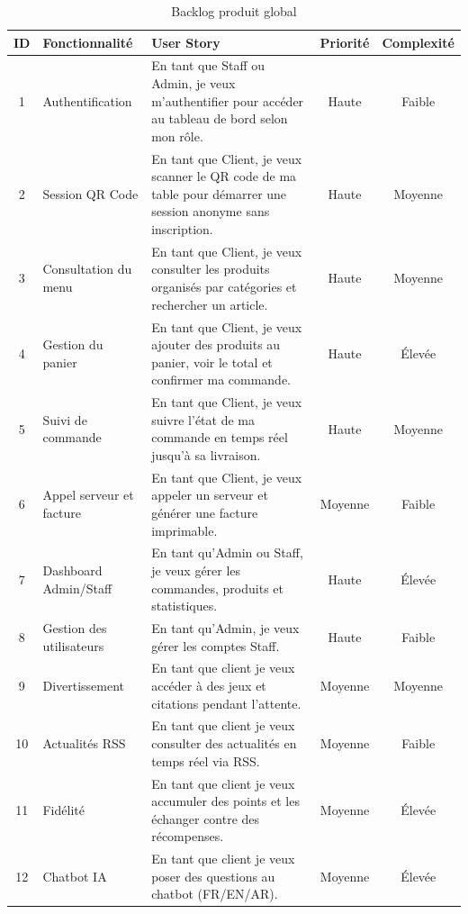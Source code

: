 \begin{table}[H]
\centering
\caption{Backlog produit global}
\label{tab:backlog}

\small
\renewcommand{\arraystretch}{1.2}
\setlength{\tabcolsep}{6pt}

\begin{tabular}{|c|p{4cm}|p{6.5cm}|c|c|}
\hline

\textbf{ID} &
\textbf{Fonctionnalité} &
\textbf{User Story} &
\textbf{Priorité} &
\textbf{Complexité} \\
\hline

1 &
Authentification &
En tant que Staff ou Admin, je veux m'authentifier pour accéder au tableau de bord selon mon rôle. &
Haute &
Faible \\
\hline

2 &
Session QR Code &
En tant que Client, je veux scanner le QR code de ma table pour démarrer une session anonyme sans inscription. &
Haute &
Moyenne \\
\hline

3 &
Consultation du menu &
En tant que Client, je veux consulter les produits organisés par catégories et rechercher un article. &
Haute &
Moyenne \\
\hline

4 &
Gestion du panier &
En tant que Client, je veux ajouter des produits au panier, voir le total et confirmer ma commande. &
Haute &
Élevée \\
\hline

5 &
Suivi de commande &
En tant que Client, je veux suivre l'état de ma commande en temps réel jusqu'à sa livraison. &
Haute &
Moyenne \\
\hline

6 &
Appel serveur et facture &
En tant que Client, je veux appeler un serveur et générer une facture imprimable. &
Moyenne &
Faible \\
\hline

7 &
Dashboard Admin/Staff &
En tant qu'Admin ou Staff, je veux gérer les commandes, produits et statistiques. &
Haute &
Élevée \\
\hline

8 &
Gestion des utilisateurs &
En tant qu'Admin, je veux gérer les comptes Staff. &
Haute &
Faible \\
\hline

9 &
Divertissement &
En tant que client je veux accéder à des jeux et citations pendant l'attente. &
Moyenne &
Moyenne \\
\hline

10 &
Actualités RSS &
En tant que client je veux consulter des actualités en temps réel via RSS. &
Moyenne &
Faible \\
\hline

11 &
Fidélité &
En tant que client je veux accumuler des points et les échanger contre des récompenses. &
Moyenne &
Élevée \\
\hline

12 &
Chatbot IA &
 En tant que client je veux poser des questions au chatbot (FR/EN/AR). &
Moyenne &
Élevée \\
\hline

\end{tabular}
\end{table}

